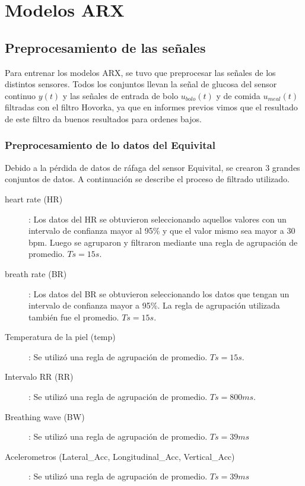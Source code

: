 \section{Modelos ARX}

\subsection{Preprocesamiento de las señales}

Para entrenar los modelos ARX, se tuvo que preprocesar las señales de los distintos sensores. Todos los conjuntos llevan la señal de glucosa del sensor continuo $y(t)$ y las señales de entrada de bolo $u_{bolo}(t)$ y de comida $u_{meal}(t)$ filtradas con el filtro Hovorka, ya que en informes previos vimos que el resultado de este filtro da buenos resultados para ordenes bajos.

\subsubsection*{Preprocesamiento de lo datos del Equivital}

Debido a la pérdida de datos de ráfaga del sensor Equivital, se crearon 3 grandes conjuntos de datos. A continuación se describe el proceso de filtrado utilizado. 

\begin{description}

\item[heart rate (HR)]: Los datos del HR se obtuvieron seleccionando aquellos valores con un intervalo de confianza mayor al 95\% y que el valor mismo sea mayor a 30 bpm. Luego se agruparon y filtraron mediante una regla de agrupación de promedio. $Ts = 15s$. 

\item[breath rate (BR)]: Los datos del BR se obtuvieron seleccionando los datos que tengan un intervalo de confianza mayor a 95\%. La regla de agrupación utilizada también fue el promedio. $Ts = 15s$.

\item[Temperatura de la piel (temp)]: Se utilizó una regla de agrupación de promedio. $Ts = 15s$.

\item[Intervalo RR (RR)]: Se utilizó una regla de agrupación de promedio. $Ts = 800ms$.

\item[Breathing wave (BW)]: Se utilizó una regla de agrupación de promedio. $Ts = 39ms$

\item[Acelerometros (Lateral\_Acc, Longitudinal\_Acc, Vertical\_Acc)]: Se utilizó una regla de agrupación de promedio. $Ts = 39ms$

\end{description}

